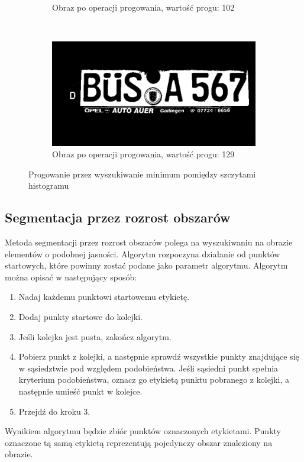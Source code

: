 \begin{figure}
\begin{subfigure}[b]{0.45\textwidth}
    \caption{Obraz po operacji progowania, wartość progu: 102}
    \label{fig:histogram_valleys_bad}
  \end{subfigure}
  ~
  \begin{subfigure}[b]{0.45\textwidth}
    \includegraphics[width=\textwidth]{img/histogram-valleys-good}
    \caption{Obraz po operacji progowania, wartość progu: 129}
    \label{fig:hitogram_valleys_good}
  \end{subfigure}
  \caption{Progowanie przez wyszukiwanie minimum pomiędzy szczytami histogramu}\label{fig:histogram_valleys}
\end{figure}
\subsection{Segmentacja przez rozrost obszarów}
Metoda segmentacji przez rozrost obszarów polega na wyszukiwaniu na obrazie elementów o podobnej jasności. Algorytm rozpoczyna działanie od punktów startowych, które powinny zostać podane jako parametr algorytmu. Algorytm można opisać w następujący sposób:
\begin{enumerate}
  \item Nadaj każdemu punktowi startowemu etykietę.
  \item Dodaj punkty startowe do kolejki.
  \item Jeśli kolejka jest pusta, zakończ algorytm.
  \item Pobierz punkt z kolejki, a następnie sprawdź wszystkie punkty znajdujące się w sąsiedztwie pod względem podobieństwa. Jeśli sąsiedni punkt spełnia kryterium podobieństwa, oznacz go etykietą punktu pobranego z kolejki, a następnie umieść punkt w kolejce.
  \item Przejdź do kroku 3.
\end{enumerate}
Wynikiem algorytmu będzie zbiór punktów oznaczonych etykietami. Punkty oznaczone tą samą etykietą reprezentują pojedynczy obszar znaleziony na obrazie.

